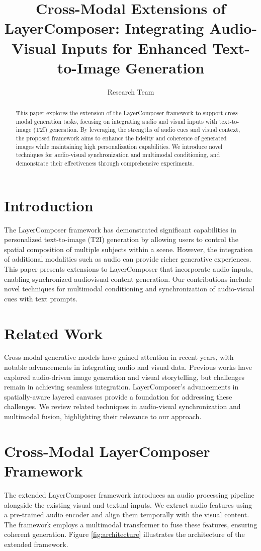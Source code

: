 \documentclass{article}
\title{Cross-Modal Extensions of LayerComposer: Integrating Audio-Visual Inputs for Enhanced Text-to-Image Generation}
\author{Research Team}
\begin{document}
\maketitle

\begin{abstract}
This paper explores the extension of the LayerComposer framework to support cross-modal generation tasks, focusing on integrating audio and visual inputs with text-to-image (T2I) generation. By leveraging the strengths of audio cues and visual context, the proposed framework aims to enhance the fidelity and coherence of generated images while maintaining high personalization capabilities. We introduce novel techniques for audio-visual synchronization and multimodal conditioning, and demonstrate their effectiveness through comprehensive experiments.
\end{abstract}

\section{Introduction}
The LayerComposer framework has demonstrated significant capabilities in personalized text-to-image (T2I) generation by allowing users to control the spatial composition of multiple subjects within a scene. However, the integration of additional modalities such as audio can provide richer generative experiences. This paper presents extensions to LayerComposer that incorporate audio inputs, enabling synchronized audiovisual content generation. Our contributions include novel techniques for multimodal conditioning and synchronization of audio-visual cues with text prompts.

\section{Related Work}
Cross-modal generative models have gained attention in recent years, with notable advancements in integrating audio and visual data. Previous works have explored audio-driven image generation and visual storytelling, but challenges remain in achieving seamless integration. LayerComposer's advancements in spatially-aware layered canvases provide a foundation for addressing these challenges. We review related techniques in audio-visual synchronization and multimodal fusion, highlighting their relevance to our approach.

\section{Cross-Modal LayerComposer Framework}
The extended LayerComposer framework introduces an audio processing pipeline alongside the existing visual and textual inputs. We extract audio features using a pre-trained audio encoder and align them temporally with the visual content. The framework employs a multimodal transformer to fuse these features, ensuring coherent generation. Figure \ref{fig:architecture} illustrates the architecture of the extended framework.
\end{document}
